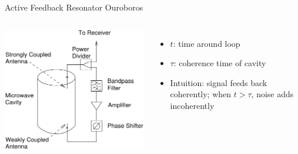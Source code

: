\documentclass{beamer}
\begin{document}
\begin{frame}{Active Feedback Resonator}
{\tiny Ouroboros}
\begin{columns}
\includegraphics[width=\textwidth]{experiment_schematic-eps-converted-to}
\begin{itemize}
\item $t$: time around loop
\item $\tau$: coherence time of cavity
\item Intuition: signal feeds back coherently; when $t > \tau$, noise adds incoherently
\end{itemize}
\end{columns}
\end{frame}
\end{document}
